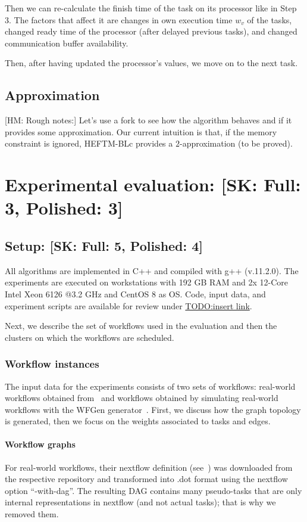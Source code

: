 \documentclass[conference]{IEEEtran}
\newcommand{\skug}[1]{{\color{blue}[SK: #1]}}
\newcommand{\hmey}[1]{{\color{red}[HM: #1]}}
\begin{document}
    Then we can re-calculate the finish time of the task on its processor like in Step 3.
    The factors that affect it are changes in own execution time $w_v$ of the tasks, changed ready time of the processor
    (after delayed previous tasks), and changed communication buffer availability.

    Then, after having updated the processor's values, we move on to the next task.


    \subsection{Approximation}
    \hmey{Rough notes:}
    Let's use a fork to see how the algorithm behaves and if it provides some approximation. Our current intuition is that, if the memory constraint is ignored, HEFTM-BLc provides a $2$-approximation (to be proved).

    \section{Experimental evaluation: \skug{Full: 3, Polished: 3}}
    \subsection{Setup: \skug{Full: 5, Polished: 4}}
    \label{sec:setup}

    All algorithms are implemented in C++ and compiled with g++ (v.11.2.0).
    The experiments are executed on workstations with 192 GB RAM and 2x 12-Core Intel Xeon 6126 @3.2 GHz
    and CentOS 8 as OS.
    Code, input data, and experiment scripts are available for review under \url{TODO:insert link}.

    Next, we describe the set of workflows used in the evaluation and then the clusters on which the
    workflows are scheduled.

    \subsubsection{Workflow instances}
    The input data for the experiments consists of two sets of workflows: real-world workflows
    obtained from~\cite{ewels2020nf} and workflows obtained by simulating real-world workflows
    with the WFGen generator~\cite{COLEMAN202216}.
    First, we discuss how the graph topology is generated,
    then we focus on the weights associated to tasks and edges.

    \paragraph{Workflow graphs}
    For real-world workflows, their nextflow definition (see~\cite{ewels2020nf}) was downloaded from the
    respective repository and transformed into .dot format using the nextflow option ``-with-dag''.
    The resulting DAG contains many pseudo-tasks that are only internal representations in nextflow
    (and not actual tasks); that is why we removed them.
\end{document}
